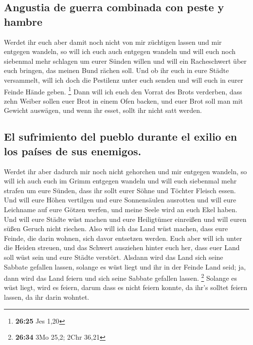 \hypertarget{angustia-de-guerra-combinada-con-peste-y-hambre}{%
\subsection{Angustia de guerra combinada con peste y
hambre}\label{angustia-de-guerra-combinada-con-peste-y-hambre}}

 Werdet ihr euch aber damit noch nicht von mir züchtigen
lassen und mir entgegen wandeln,  so will ich euch auch
entgegen wandeln und will euch noch siebenmal mehr schlagen um eurer
Sünden willen  und will ein Racheschwert über euch
bringen, das meinen Bund rächen soll. Und ob ihr euch in eure Städte
versammelt, will ich doch die Pestilenz unter euch senden und will euch
in eurer Feinde Hände geben. \footnote{\textbf{26:25} Jes 1,20}
 Dann will ich euch den Vorrat des Brots verderben, dass
zehn Weiber sollen euer Brot in einem Ofen backen, und euer Brot soll
man mit Gewicht auswägen, und wenn ihr esset, sollt ihr nicht satt
werden.

\hypertarget{el-sufrimiento-del-pueblo-durante-el-exilio-en-los-pauxedses-de-sus-enemigos.}{%
\subsection{El sufrimiento del pueblo durante el exilio en los países de
sus
enemigos.}\label{el-sufrimiento-del-pueblo-durante-el-exilio-en-los-pauxedses-de-sus-enemigos.}}

 Werdet ihr aber dadurch mir noch nicht gehorchen und mir
entgegen wandeln,  so will ich auch euch im Grimm
entgegen wandeln und will euch siebenmal mehr strafen um eure Sünden,
 dass ihr sollt eurer Söhne und Töchter Fleisch essen.
 Und will eure Höhen vertilgen und eure Sonnensäulen
ausrotten und will eure Leichname auf eure Götzen werfen, und meine
Seele wird an euch Ekel haben.  Und will eure Städte wüst
machen und eure Heiligtümer einreißen und will euren süßen Geruch nicht
riechen.  Also will ich das Land wüst machen, dass eure
Feinde, die darin wohnen, sich davor entsetzen werden. 
Euch aber will ich unter die Heiden streuen, und das Schwert ausziehen
hinter euch her, dass euer Land soll wüst sein und eure Städte verstört.
 Alsdann wird das Land sich seine Sabbate gefallen
lassen, solange es wüst liegt und ihr in der Feinde Land seid; ja, dann
wird das Land feiern und sich seine Sabbate gefallen lassen. \footnote{\textbf{26:34}
  3Mo 25,2; 2Chr 36,21}  Solange es wüst liegt, wird es
feiern, darum dass es nicht feiern konnte, da ihr's solltet feiern
lassen, da ihr darin wohntet.

